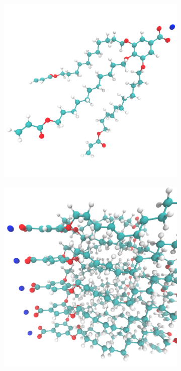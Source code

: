 \documentclass[journal=jpcbfk,manuscript=article]{achemso}
\begin{document}
  \begin{figure}[!htb]
  \centering
  \begin{subfigure}[t]{0.45\textwidth}
  \includegraphics[width=\linewidth]{monomer_diagonal.png}
  \caption{}
  \end{subfigure}
  \begin{subfigure}[t]{0.42\textwidth}
  \includegraphics[width=\linewidth]{stacked_monomers.png}

\end{subfigure}
\end{figure}
\end{document}
